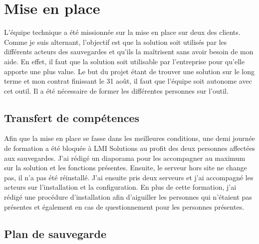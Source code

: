 \documentclass[pfe]{tnreport} %
\begin{document}
\section{Mise en place}

L'équipe technique a été missionnée sur la mise en place sur deux des clients. \newline
Comme je suis alternant, l'objectif est que la solution soit utilisés par les différents acteurs des sauvegardes et qu'ils la maîtrisent sans avoir besoin de mon aide. \newline
En effet, il faut que la solution soit utilisable par l'entreprise pour qu'elle apporte une plus value. \newline
Le but du projet étant de trouver une solution sur le long terme et mon contrat finissant le 31 août, il faut que l'équipe soit autonome avec cet outil. \newline  
Il a été nécessaire de former les différentes personnes sur l'outil.

\subsection{Transfert de compétences}

Afin que la mise en place se fasse dans les meilleures conditions, une demi journée de formation a été bloquée à LMI Solutions au profit des deux personnes affectées aux sauvegardes. \newline
J'ai rédigé un diaporama pour les accompagner au maximum sur la solution et les fonctions présentes. \newline
Ensuite, le serveur hors site ne change pas, il n'a pas été réinstallé. \newline
J'ai ensuite pris deux serveurs et j'ai accompagné les acteurs sur l'installation et la configuration. \newline
En plus de cette formation, j'ai rédigé une procédure d'installation afin d'aiguiller les personnes qui n'étaient pas présentes et également en cas de questionnement pour les personnes présentes. \newline 

\subsection{Plan de sauvegarde}
\end{document}
